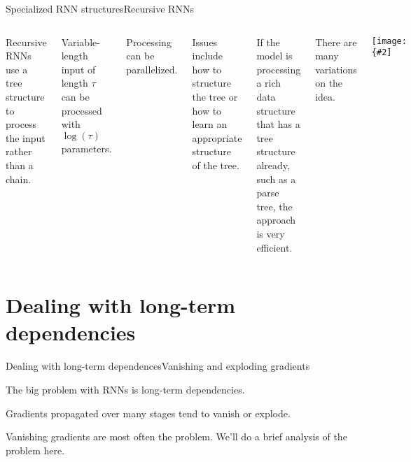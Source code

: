 \documentclass{beamer}
\newcommand{\myfig}[3]{\centerline{\texttt{[image: \{\#2]}}}
    \centerline{\scriptsize #3}}
\begin{document}
\begin{frame}{Specialized RNN structures}{Recursive RNNs}

  \begin{columns}

    \column{2.5in}
    
    \alert{Recursive} RNNs use a tree structure to process the input rather
    than a chain.

    \medskip

    Variable-length input of length $\tau$ can be processed with
    $\log(\tau)$ parameters.

    \medskip
    
    Processing can be parallelized.

    \medskip

    Issues include how to structure the tree or how to learn an
    appropriate structure of the tree.

    \medskip

    If the model is processing a rich data structure that has a tree
    structure already, such as a parse tree, the approach is very efficient.

    \medskip
    
    There are many variations on the idea.
    
    \column{2in}
    
    \myfig{1.5in}{goodfellow-fig10-14}{Goodfellow et al.\ (2016), Fig.\ 10.14}

  \end{columns}
  
\end{frame}


\section{Dealing with long-term dependencies}


\begin{frame}{Dealing with long-term dependences}{Vanishing and exploding gradients}

  The big problem with RNNs is \alert{long-term dependencies}.

  \medskip

  Gradients propagated over many stages tend to \alert{vanish} or
  \alert{explode}.

  \medskip

  Vanishing gradients are most often the problem. We'll do a brief
  analysis of the problem here.

\end{frame}
\end{document}
